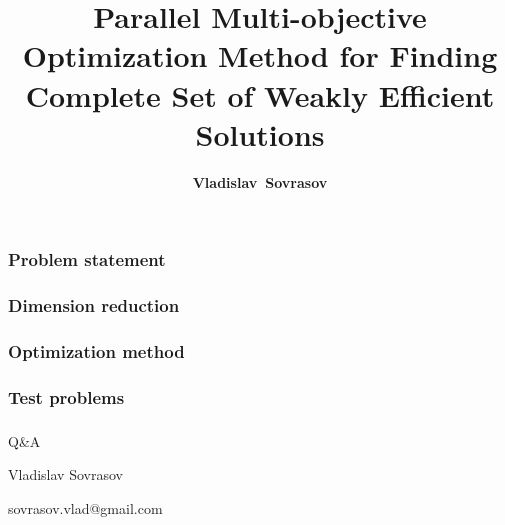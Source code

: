\documentclass[aspectratio=1610]{beamer}
\title{Parallel Multi-objective Optimization Method for Finding Complete Set of Weakly Efficient Solutions}
\author{\textbf{Vladislav~Sovrasov}}
\institute{Lobachevsky University}
\date{}
\begin{document}
\begin{frame}
\titlepage
\end{frame}

\begin{frame}
  \frametitle{Problem statement}

\end{frame}

\begin{frame}
  \frametitle{Dimension reduction}

\end{frame}

\begin{frame}
  \frametitle{Optimization method}

\end{frame}

\begin{frame}
  \frametitle{Test problems}
\end{frame}

\begin{frame}{{}}
  \frametitle{ }
  \begin{center}
    \Large{Q\&A}

\vspace{1cm}
    Vladislav Sovrasov

    sovrasov.vlad@gmail.com
  \end{center}
\end{frame}
\end{document}

